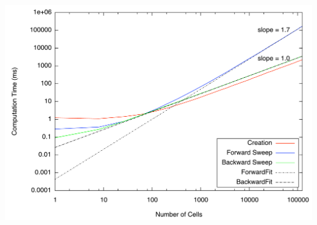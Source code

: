 \documentclass{beamer}
\begin{document}
\begin{frame}
\begin{columns}[c]
\end{columns}
\end{frame}
\begin{frame}
    \includegraphics[width=\textwidth, keepaspectratio]{MeshTiming}
\end{frame}
\end{document}
